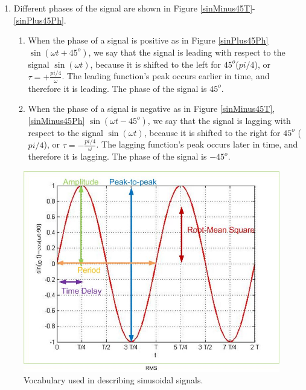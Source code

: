\documentclass{ximera}
\begin{document}
\begin{enumerate}
\item Different phases of the signal are shown in Figure \ref{sinMinus45T}-\ref{sinPlus45Ph}. 
\begin{enumerate}
\item When the phase of a signal is positive as in Figure \ref{sinPlus45Ph} $ \sin (\omega t + 45^o)$, we say that the signal is leading with respect to the signal $ \sin (\omega t)$, because it is shifted to the left for $45^o$($pi/4$), or $\tau=+\frac{pi/4}{\omega} $. The leading function's peak occurs earlier in time, and therefore it is leading. The phase of the signal is $45^o$. 
\item When the phase of a signal is negative as in Figure \ref{sinMinus45T}, \ref{sinMinus45Ph} $ \sin (\omega t - 45^o)$, we say that the signal is lagging with respect to the signal $ \sin (\omega t)$, because it is shifted to the right for $45^o$ ($pi/4$), or $\tau=-\frac{pi/4}{\omega} $. The lagging function's peak occurs later in time, and therefore it is lagging. The phase of the signal is $-45^o$.
\end{enumerate}
\end{enumerate}


\begin{figure}
\includegraphics[scale=0.4]{jpg/sinusoid.jpg}
\caption{Vocabulary used in describing sinusoidal signals.}
\label{sinusoid}
\end{figure} 
\end{document}
